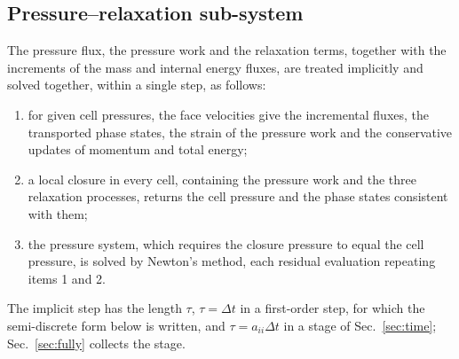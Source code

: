 \subsection{Pressure--relaxation sub-system}
\label{sec:implicit}
The pressure flux, the pressure work and the relaxation terms, together with the increments of the mass and internal energy
fluxes, are treated implicitly and solved together, within a single step, as follows:
\begin{enumerate}
\item for given cell pressures, the face velocities give the incremental fluxes, the transported phase states, the
strain of the pressure work and the conservative updates of momentum and total energy;
\item a local closure in every cell, containing the pressure work and the three relaxation processes, returns the cell
pressure and the phase states consistent with them;
\item the pressure system, which requires the closure pressure to equal the cell pressure, is solved by Newton's method,
each residual evaluation repeating items 1 and 2.
\end{enumerate}
The implicit step has the length $\tau$, $\tau=\Delta t$ in a first-order step, for which the semi-discrete form below is
written, and $\tau=a_{ii}\Delta t$ in a stage of Sec.~\ref{sec:time}; Sec.~\ref{sec:fully} collects the stage.

